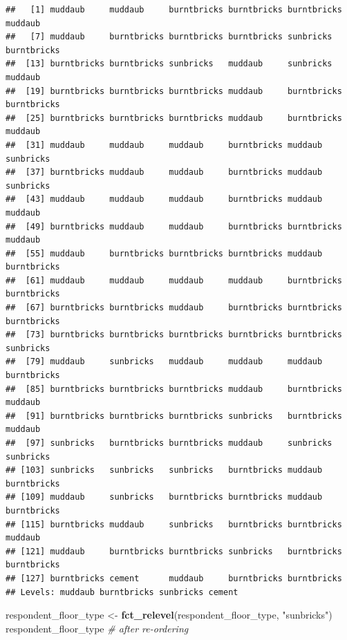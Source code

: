 \documentclass[]{book}
\newenvironment{Shaded}{\begin{snugshade}}{\end{snugshade}}
\newcommand{\KeywordTok}[1]{\textcolor[rgb]{0.13,0.29,0.53}{\textbf{#1}}}
\newcommand{\StringTok}[1]{\textcolor[rgb]{0.31,0.60,0.02}{#1}}
\newcommand{\CommentTok}[1]{\textcolor[rgb]{0.56,0.35,0.01}{\textit{#1}}}
\newcommand{\NormalTok}[1]{#1}
\begin{document}
\begin{verbatim}
##   [1] muddaub     muddaub     burntbricks burntbricks burntbricks muddaub    
##   [7] muddaub     burntbricks burntbricks burntbricks sunbricks   burntbricks
##  [13] burntbricks burntbricks sunbricks   muddaub     sunbricks   muddaub    
##  [19] burntbricks burntbricks burntbricks muddaub     burntbricks burntbricks
##  [25] burntbricks burntbricks burntbricks muddaub     burntbricks muddaub    
##  [31] muddaub     muddaub     muddaub     burntbricks muddaub     sunbricks  
##  [37] burntbricks muddaub     muddaub     burntbricks muddaub     sunbricks  
##  [43] muddaub     muddaub     muddaub     burntbricks muddaub     muddaub    
##  [49] burntbricks muddaub     muddaub     burntbricks burntbricks muddaub    
##  [55] muddaub     burntbricks burntbricks burntbricks muddaub     burntbricks
##  [61] muddaub     muddaub     muddaub     muddaub     burntbricks burntbricks
##  [67] burntbricks burntbricks muddaub     burntbricks burntbricks burntbricks
##  [73] burntbricks burntbricks burntbricks burntbricks burntbricks sunbricks  
##  [79] muddaub     sunbricks   muddaub     muddaub     muddaub     burntbricks
##  [85] burntbricks burntbricks burntbricks muddaub     burntbricks muddaub    
##  [91] burntbricks burntbricks burntbricks sunbricks   burntbricks muddaub    
##  [97] sunbricks   burntbricks burntbricks muddaub     sunbricks   sunbricks  
## [103] sunbricks   sunbricks   sunbricks   burntbricks muddaub     burntbricks
## [109] muddaub     sunbricks   burntbricks burntbricks muddaub     burntbricks
## [115] burntbricks muddaub     sunbricks   burntbricks burntbricks muddaub    
## [121] muddaub     burntbricks burntbricks sunbricks   burntbricks burntbricks
## [127] burntbricks cement      muddaub     burntbricks burntbricks
## Levels: muddaub burntbricks sunbricks cement
\end{verbatim}

\begin{Shaded}
\begin{Highlighting}[]
\NormalTok{respondent_floor_type <-}\StringTok{ }\KeywordTok{fct_relevel}\NormalTok{(respondent_floor_type, }\StringTok{"sunbricks"}\NormalTok{)}
\NormalTok{respondent_floor_type }\CommentTok{# after re-ordering}
\end{Highlighting}
\end{Shaded}
\end{document}
